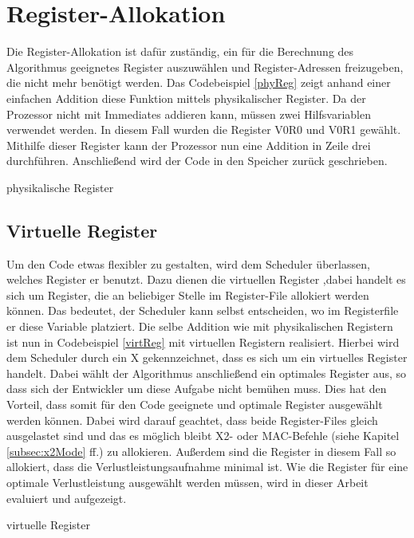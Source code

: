 \section{Register-Allokation}
\label{sec:register allok}
Die Register-Allokation ist dafür zuständig, ein für die Berechnung des Algorithmus geeignetes Register auszuwählen und Register-Adressen freizugeben, die nicht mehr benötigt werden.
Das Codebeispiel \ref{phyReg} zeigt anhand einer einfachen Addition diese Funktion mittels physikalischer Register. Da der Prozessor nicht mit Immediates addieren kann, müssen zwei Hilfsvariablen verwendet werden. In diesem Fall wurden die Register V0R0 und V0R1 gewählt. Mithilfe dieser Register kann der Prozessor nun eine Addition in Zeile drei durchführen. Anschließend wird der Code in den Speicher zurück geschrieben.
\begin{algorithm}[H]
	\begin{algorithmic}[1]
		\caption{physikalische Register}
		\label{phyReg}
	\end{algorithmic}
\end{algorithm}

\subsection{Virtuelle Register}
\label{sub:virtuelleR}
Um den Code etwas flexibler zu gestalten, wird dem Scheduler überlassen, welches Register er benutzt. Dazu dienen die virtuellen Register ,dabei handelt es sich um Register, die an beliebiger Stelle im Register-File allokiert werden können. Das bedeutet, der Scheduler kann selbst entscheiden, wo im Registerfile er diese Variable platziert. 
Die selbe Addition wie mit physikalischen Registern ist nun in Codebeispiel \ref{virtReg} mit virtuellen Registern realisiert. Hierbei wird dem Scheduler durch ein X gekennzeichnet, dass es sich um ein virtuelles Register handelt. Dabei wählt der Algorithmus anschließend ein optimales Register aus, so dass sich der Entwickler um diese Aufgabe nicht bemühen muss. Dies hat den Vorteil, dass somit für den Code geeignete und optimale Register ausgewählt werden können. Dabei wird darauf geachtet, dass beide Register-Files gleich ausgelastet sind und das es möglich bleibt X2- oder MAC-Befehle (siehe Kapitel \ref{subsec:x2Mode} ff.) zu allokieren. Außerdem sind die Register in diesem Fall so allokiert, dass die Verlustleistungsaufnahme minimal ist. Wie die Register für eine optimale Verlustleistung ausgewählt werden müssen, wird in dieser Arbeit evaluiert und aufgezeigt.\\
\begin{algorithm}[H]
	\begin{algorithmic}[1]
		\caption{virtuelle Register}
		\label{virtReg}
	\end{algorithmic}
\end{algorithm}
